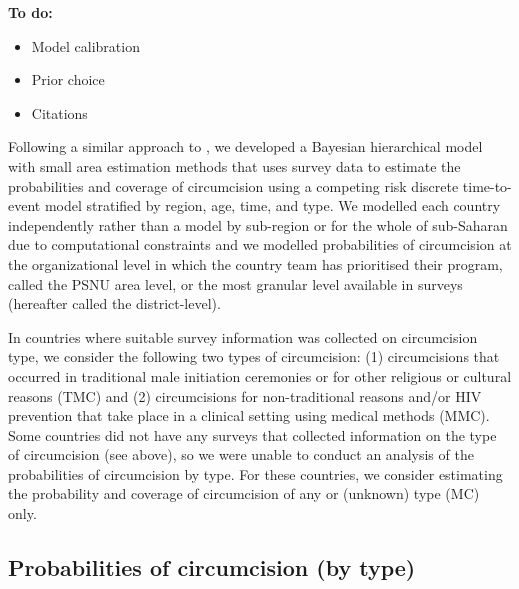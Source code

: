 \documentclass{article}
\begin{document}
\begin{appendix}

{\color{red} \bf
To do:
\begin{itemize}
    \item Model calibration
    \item Prior choice
    \item Citations
\end{itemize}}

Following a similar approach to \cite{thomas2021multilevel}, we developed a Bayesian hierarchical model with small area estimation methods that uses survey data to estimate the probabilities and coverage of circumcision using a competing risk discrete time-to-event model stratified by region, age, time, and type. We modelled each country independently rather than a model by sub-region or for the whole of sub-Saharan due to computational constraints and we modelled probabilities of circumcision at the organizational level in which the country team has prioritised their program, called the PSNU area level, or the most granular level available in surveys (hereafter called the district-level). 

In countries where suitable survey information was collected on circumcision type, we consider the following two types of circumcision: (1) circumcisions that occurred in traditional male initiation ceremonies or for other religious or cultural reasons (TMC) and (2) circumcisions for non-traditional reasons and/or HIV prevention that take place in a clinical setting using medical methods (MMC). Some countries did not have any surveys that collected information on the type of circumcision (see above), so we were unable to conduct an analysis of the probabilities of circumcision by type. For these countries, we consider estimating the probability and coverage of circumcision of any or (unknown) type (MC) only. 


\subsection{Probabilities of circumcision (by type)}
\label{sec::bytype}



\end{appendix}
\end{document}
